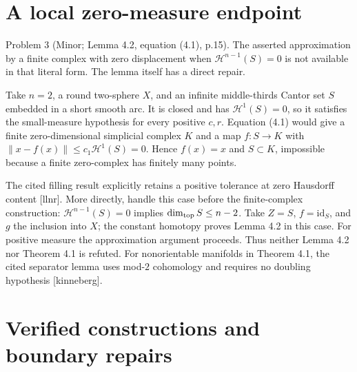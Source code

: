 \documentclass[10pt]{article}
\begin{document}
\section*{A local zero-measure endpoint}
Problem 3 (Minor; Lemma 4.2, equation (4.1), p.15).  The asserted approximation by a finite complex with zero displacement when \(\mathcal H^{n-1}(S)=0\) is not available in that literal form. The lemma itself has a direct repair.\par
Take \(n=2\), a round two-sphere \(X\), and an infinite middle-thirds Cantor set \(S\) embedded in a short smooth arc. It is closed and has \(\mathcal H^1(S)=0\), so it satisfies the small-measure hypothesis for every positive \(c,r\). Equation (4.1) would give a finite zero-dimensional simplicial complex \(K\) and a map \(f:S\to K\) with \(\|x-f(x)\|\le c_1\mathcal H^1(S)=0\). Hence \(f(x)=x\) and \(S\subset K\), impossible because a finite zero-complex has finitely many points.\par
The cited filling result explicitly retains a positive tolerance at zero Hausdorff content [llnr]. More directly, handle this case before the finite-complex construction: \(\mathcal H^{n-1}(S)=0\) implies \(\dim_{\rm top}S\le n-2\). Take \(Z=S\), \(f=\mathrm{id}_S\), and \(g\) the inclusion into \(X\); the constant homotopy proves Lemma 4.2 in this case. For positive measure the approximation argument proceeds. Thus neither Lemma 4.2 nor Theorem 4.1 is refuted. For nonorientable manifolds in Theorem 4.1, the cited separator lemma uses mod-\(2\) cohomology and requires no doubling hypothesis [kinneberg].\par
\section*{Verified constructions and boundary repairs}
\end{document}
